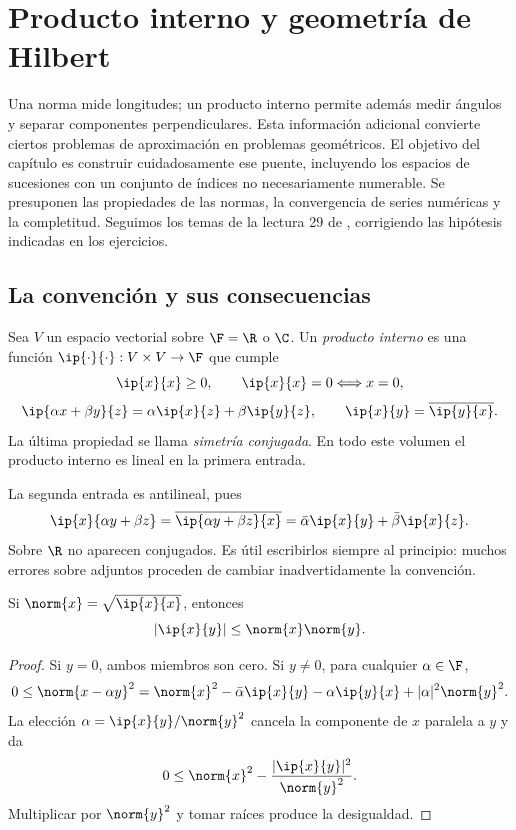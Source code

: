 \chapter{Producto interno y geometría de Hilbert}\label{chap:29}

Una norma mide longitudes; un producto interno permite además medir ángulos y separar componentes perpendiculares. Esta información adicional convierte ciertos problemas de aproximación en problemas geométricos. El objetivo del capítulo es construir cuidadosamente ese puente, incluyendo los espacios de sucesiones con un conjunto de índices no necesariamente numerable. Se presuponen las propiedades de las normas, la convergencia de series numéricas y la completitud. Seguimos los temas de la lectura 29 de \cite{valencia}, corrigiendo las hipótesis indicadas en los ejercicios.

\section{La convención y sus consecuencias}
\begin{definicion}
Sea $V$ un espacio vectorial sobre $\F=\R$ o $\C$. Un \emph{producto interno} es una función $\ip{\cdot}{\cdot}:V\times V\to\F$ que cumple
\[
 \ip{x}{x}\geq0,\qquad \ip{x}{x}=0\Longleftrightarrow x=0,
\]
\[
 \ip{\alpha x+\beta y}{z}=\alpha\ip{x}{z}+\beta\ip{y}{z},
 \qquad \ip{x}{y}=\overline{\ip{y}{x}}.
\]
La última propiedad se llama \emph{simetría conjugada}. En todo este volumen el producto interno es lineal en la primera entrada.
\end{definicion}
La segunda entrada es antilineal, pues
\[
 \ip{x}{\alpha y+\beta z}
 =\overline{\ip{\alpha y+\beta z}{x}}
 =\bar\alpha\ip{x}{y}+\bar\beta\ip{x}{z}.
\]
Sobre $\R$ no aparecen conjugados. Es útil escribirlos siempre al principio: muchos errores sobre adjuntos proceden de cambiar inadvertidamente la convención.

\begin{teorema}\label{ch29:cs}
Si $\norm{x}=\sqrt{\ip{x}{x}}$, entonces
\[
 |\ip{x}{y}|\leq\norm{x}\norm{y}.
\]
\end{teorema}
\begin{proof}
Si $y=0$, ambos miembros son cero. Si $y\ne0$, para cualquier $\alpha\in\F$,
\[
0\leq\norm{x-\alpha y}^{2}
=\norm{x}^{2}-\bar\alpha\ip{x}{y}-\alpha\ip{y}{x}
 +|\alpha|^{2}\norm{y}^{2}.
\]
La elección $\alpha=\ip{x}{y}/\norm{y}^{2}$ cancela la componente de $x$ paralela a $y$ y da
\[
0\leq\norm{x}^{2}-\frac{|\ip{x}{y}|^{2}}{\norm{y}^{2}}.
\]
Multiplicar por $\norm{y}^{2}$ y tomar raíces produce la desigualdad.
\end{proof}

